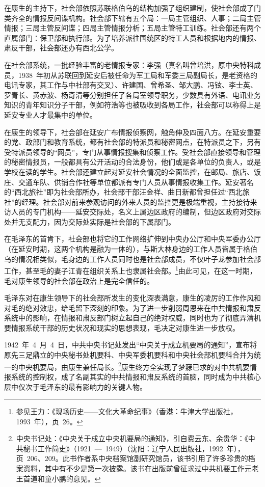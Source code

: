 在康生的主持下，社会部依照苏联格伯乌的结构加强了组织建制，使社会部成了门类齐全的情报反间谍机构。社会部下辖有五个局：一局主管组织、人事；二局主管情报；三局主管反间谍；四局主管情报分析；五局主管特工训练。社会部还有两个直属部门：保卫部和执行部。为了培养派往国统区的特工人员和根据地内的情报、肃反干部，社会部还办有西北公学。

在社会部系统，一批经验丰富的老情报专家：李强（真名叫曾培洪，原中央特科成员，1938~年初从苏联回到延安后被任命为军工局和军委三局副局长，是老资格的电讯专家，其工作与中社部有交叉）、许建国、曾希圣、邹大鹏、冯铉、李士英、罗青长、黄赤波、杨奇清等分别担任了各局室领导职务，少数具有外语、电讯业务知识的青年知识分子干部，例如符浩等也被吸收到各局工作，社会部可以称得上是延安专业人才最集中的单位。

在康生的领导下，社会部在延安广布情报侦察网，触角伸及四面八方。在延安重要的党、政部门和教育系统，都有社会部的特派员和秘密网点，在特派员之下，另有受特派员领导的“网员”，专门从事情报搜集和侦察工作。受社会部直接领导和管理的秘密情报员，一般都具有公开活动的合法身份，他们或是各单位的负责人，或是学校在读的学生。社会部还建立起对延安社会情况的全面监控，在邮局、旅店、饭庄、交通车队、供销合作社等单位都派有专门人员从事情报收集工作。延安著名的“西北旅社”即为社会部所办，社会部干部汪金祥、曲日新都曾担任过“西北旅社”的经理。社会部对前来参观访问的外来人员的监控更是极端重视，主持接待来访人员的专门机构——延安交际处，名义上属边区政府的编制，但边区政府对交际处并无支配力，因为交际处实际是社会部的下属部门。

在毛泽东的首肯下，社会部也将它的工作网络扩伸到中央办公厅和中央军委办公厅（在延安时期，这两个机构是融为一体的），与斯大林身边的工作人员皆属于格伯乌的情况相类似，毛身边的工作人员同时也是社会部成员，不仅叶子龙参加社会部工作，甚至毛的妻子江青在组织关系上也隶属社会部。\footnote{参见王力：《现场历史——文化大革命纪事》（香港：牛津大学出版社，1993~年），页~26。}由此可见，在这一时期，毛对康生领导的社会部在政治上是完全信任的。

毛泽东对在康生领导下的社会部所发生的变化深表满意，康生的凌厉的工作作风和对毛的绝对效忠，给毛留下深刻的印象。为了进一步削弱周恩来在中共情报和肃反系统中的影响，在情报和肃反部门树立起自己的绝对权威，同时也为了彻底弄清机要情报系统干部的历史状况和现实的思想表现，毛决定对康生进一步放权。

1942~年~4~月~4~日，中共中央书记处发出“中央关于成立机要局的通知”，宣布将原先三足鼎立的中央秘书处机要科、中央军委机要科和中央社会部机要科合并为统一的中央机要局，由康生兼任局长。\footnote{中央书记处：《中央关于成立中央机要局的通知》，引自费云东、余贵华：《中共秘书工作简史》（1921~—~1949）（沈阳：辽宁人民出版社，1992~年），页~206、209。此书作者系中央档案馆副研究馆员，该书引用了许多珍贵的档案资料，其中有不少是第一次披露。该书在出版前曾征求过中共机要工作元老王首道和童小鹏的意见。}康生终方全实现了梦寐已求的对中共机要情报系统的控制权，成了名副其实的中共情报和肃反系统的首脑，同时成为中共核心层中仅次于毛泽东的最有影响力的关键人物。

